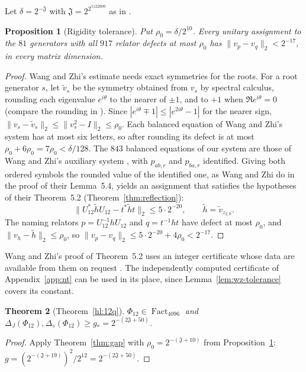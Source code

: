 \documentclass[11pt]{article}
\newtheorem{theorem}{Theorem}[section]
\newtheorem{proposition}[theorem]{Proposition}
\newcommand{\Fact}{\operatorname{Fact}}
\newcommand{\cJ}{\mathfrak J}
\begin{document}
Let $\delta=2^{-\cJ}$ with $\cJ=2^{2^{1122000}}$ as in \cite[(2.20)]{WangZhi26}.

\begin{proposition}[Rigidity tolerance]\label{prop:rho}
Put $\rho_0=\delta/2^{10}$.  Every unitary assignment to the $81$ generators with all $917$ relator defects at most $\rho_0$ has $\|v_p-v_q\|_2<2^{-17}$, in every matrix dimension.
\end{proposition}
\begin{proof}
Wang and Zhi's estimate needs exact symmetries for the roots.  For a root generator $s$, let $\tilde v_s$ be the symmetry obtained from $v_s$ by spectral calculus, rounding each eigenvalue $e^{i\theta}$ to the nearer of $\pm1$, and to $+1$ when $\Re e^{i\theta}=0$ (compare the rounding in \cite[Lemma~5.4]{WangZhi26}).  Since $|e^{i\theta}\mp1|\le|e^{2i\theta}-1|$ for the nearer sign, $\|v_s-\tilde v_s\|_2\le\|v_s^2-I\|_2\le\rho_0$.  Each balanced equation of Wang and Zhi's system has at most six letters, so after rounding its defect is at most $\rho_0+6\rho_0=7\rho_0<\delta/128$.  The $843$ balanced equations of our system are those of Wang and Zhi's auxiliary system \cite[Section~5.1]{WangZhi26}, with $p_{ab,r}$ and $p_{ba,r}$ identified.  Giving both ordered symbols the rounded value of the identified one, as Wang and Zhi do in the proof of their Lemma~5.4, yields an assignment that satisfies the hypotheses of their Theorem~5.2 (Theorem~\ref{thm:reflection}):
\[
 \|U_{12}^*\tilde hU_{12}-t^*\tilde ht\|_2\le5\cdot2^{-20},\qquad \tilde h=\tilde v_{z_{2,0}}.
\]
The naming relators $p=U_{12}^{-1}hU_{12}$ and $q=t^{-1}ht$ have defect at most $\rho_0$, and $\|v_h-\tilde h\|_2\le\rho_0$, so $\|v_p-v_q\|_2\le5\cdot2^{-20}+4\rho_0<2^{-17}$.
\end{proof}

Wang and Zhi's proof of Theorem~5.2 uses an integer certificate whose data are available from them on request \cite[proof of Lemma~3.3]{WangZhi26}.  The independently computed certificate of Appendix~\ref{app:nt} can be used in its place, since Lemma~\ref{lem:wz-tolerance} covers its constant.

\begin{theorem}[Theorem~\ref{hl:12q}]\label{thm:12q}
$\Phi_{12}\in\Fact_{4096}$ and $\Delta_J(\Phi_{12}),\Delta_\diamond(\Phi_{12})\ge g_*=2^{-(2\cJ+50)}$.
\end{theorem}
\begin{proof}
Apply Theorem~\ref{thm:gap} with $\rho_0=2^{-(\cJ+10)}$ from Proposition~\ref{prop:rho}: $g=(2^{-(\cJ+19)})^2/2^{12}=2^{-(2\cJ+50)}$.
\end{proof}
\end{document}
